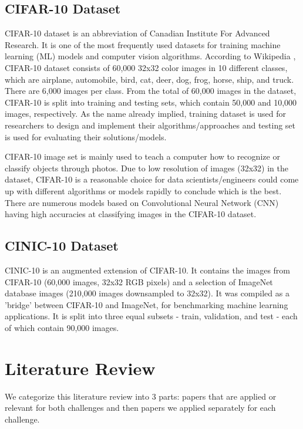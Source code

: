 \documentclass[10pt,twocolumn,letterpaper]{article}
\begin{document}
 
\subsection{CIFAR-10 Dataset} 
CIFAR-10 dataset \cite{CIFAR-10} is an abbreviation of Canadian Institute For Advanced Research. It is one of the most frequently used datasets for training machine learning (ML) models and computer vision algorithms. According to Wikipedia \cite{wiki:cf10}, CIFAR-10 dataset  consists of 60,000 32x32 color images in 10 different classes, which are airplane, automobile, bird, cat, deer, dog, frog, horse, ship, and truck. There are 6,000 images per class. From the total of 60,000 images in the dataset, CIFAR-10 is split into training and testing sets, which contain 50,000 and 10,000 images, respectively. As the name already implied, training dataset is used for researchers to design and implement their algorithms/approaches and testing set is used for evaluating their solutions/models.

CIFAR-10 image set is mainly used to teach a computer how to recognize or classify objects through photos. Due to low resolution of images (32x32) in the dataset, CIFAR-10 is a reasonable choice for data scientists/engineers could come up with different algorithms or models rapidly to conclude which is the best. There are numerous models based on Convolutional Neural Network (CNN) \cite{krizhevsky12_cnn} having high accuracies at classifying images in the CIFAR-10 dataset.
 
\subsection{CINIC-10 Dataset} 
CINIC-10 is an augmented extension of CIFAR-10. It contains the images from CIFAR-10 (60,000 images, 32x32 RGB pixels) and a selection of ImageNet database images (210,000 images downsampled to 32x32). It was compiled as a 'bridge' between CIFAR-10 and ImageNet, for benchmarking machine learning applications. It is split into three equal subsets - train, validation, and test - each of which contain 90,000 images.
\cite{cinic-10}



\section{Literature Review}
We categorize this literature review into 3 parts: papers that are applied or relevant for both challenges and then papers we applied separately for each challenge.  
\end{document}
